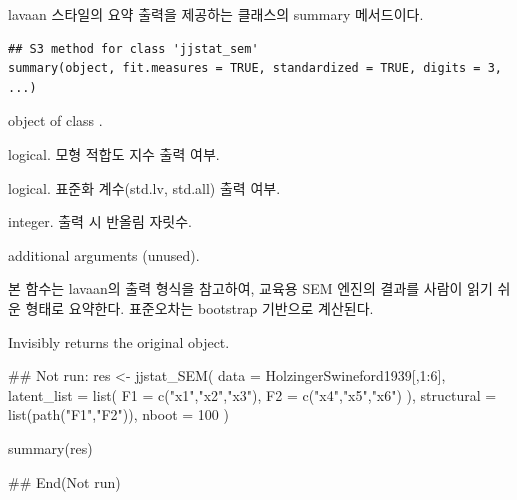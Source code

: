 \documentclass[a4paper]{book}
\begin{document}
%
\begin{Description}
lavaan 스타일의 요약 출력을 제공하는
 클래스의 summary 메서드이다.
\end{Description}
%
\begin{Usage}
\begin{verbatim}
## S3 method for class 'jjstat_sem'
summary(object, fit.measures = TRUE, standardized = TRUE, digits = 3, ...)
\end{verbatim}
\end{Usage}
%
\begin{Arguments}
\begin{ldescription}
\item[\code{object}] object of class .

\item[\code{fit.measures}] logical.
모형 적합도 지수 출력 여부.

\item[\code{standardized}] logical.
표준화 계수(std.lv, std.all) 출력 여부.

\item[\code{digits}] integer.
출력 시 반올림 자릿수.

\item[\code{...}] additional arguments (unused).
\end{ldescription}
\end{Arguments}
%
\begin{Details}
본 함수는 lavaan의  출력 형식을 참고하여,
교육용 SEM 엔진의 결과를 사람이 읽기 쉬운 형태로 요약한다.
표준오차는 bootstrap 기반으로 계산된다.
\end{Details}
%
\begin{Value}
Invisibly returns the original  object.
\end{Value}
%
\begin{Examples}
\begin{ExampleCode}
\#\# Not run: 
res <- jjstat_SEM(
  data = HolzingerSwineford1939[,1:6],
  latent_list = list(
    F1 = c("x1","x2","x3"),
    F2 = c("x4","x5","x6")
  ),
  structural = list(path("F1","F2")),
  nboot = 100
)

summary(res)

## End(Not run)
\end{ExampleCode}
\end{Examples}
\end{document}
